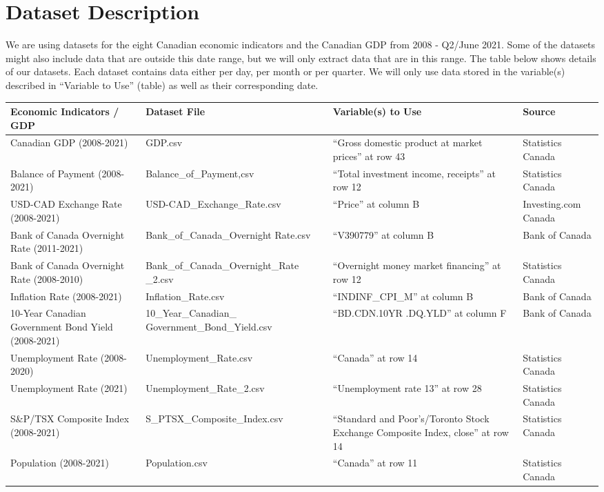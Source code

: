 \documentclass{article}
\begin{document}
\section{Dataset Description}  
We are using datasets for the eight Canadian economic indicators and the Canadian GDP from 2008 - Q2/June 2021. Some of the datasets might also include data that are outside this date range, but we will only extract data that are in this range. The table below shows details of our datasets. Each dataset contains data either per day, per month or per quarter. We will only use data stored in the variable(s) described in “Variable to Use” (table) as well as their corresponding date.
\begin{center}  
  
\begin{tabular}{ | m{3cm} | m{5cm}| m{3cm} | m{2.5cm} | }   
  \hline  
  \textbf{Economic Indicators / GDP} & \textbf{Dataset File} & \textbf{Variable(s) to Use} & \textbf{Source}\\  
  \hline\hline  
  Canadian GDP (2008-2021) & GDP.csv & “Gross domestic product at market prices” at row 43 & Statistics Canada \\  
  \hline  
  Balance of Payment (2008-2021)& Balance\_of\_Payment,csv & “Total investment income, receipts” at row 12 & Statistics Canada \\  
  \hline  
  USD-CAD Exchange Rate (2008-2021)& USD-CAD\_Exchange\_Rate.csv & “Price” at column B & Investing.com Canada  \\  
  \hline  
  Bank of Canada Overnight Rate (2011-2021)& Bank\_of\_Canada\_Overnight Rate.csv & “V390779” at column B & Bank of Canada\\  
  \hline  
  Bank of Canada Overnight Rate (2008-2010)& Bank\_of\_Canada\_Overnight\_Rate
  \_2.csv & “Overnight money market financing” at row 12 & Statistics Canada\\  
  \hline  
  Inflation Rate (2008-2021)& Inflation\_Rate.csv & “INDINF\_CPI\_M” at column B & Bank of Canada\\  
  \hline  
  10-Year Canadian Government Bond Yield (2008-2021)& 10\_Year\_Canadian\_ Government\_Bond\_Yield.csv & “BD.CDN.10YR .DQ.YLD” at column F & Bank of Canada\\  
  \hline  
  Unemployment Rate (2008-2020)& Unemployment\_Rate.csv & “Canada” at row 14 & Statistics Canada \\ 
  \hline  
  Unemployment Rate (2021)& Unemployment\_Rate\_2.csv & “Unemployment rate 13” at row 28 & Statistics Canada \\  
  \hline  
  S\&P/TSX Composite Index (2008-2021)& S\_PTSX\_Composite\_Index.csv & “Standard and Poor's/Toronto Stock Exchange Composite Index, close” at row 14 & Statistics Canada \\  
  \hline  
  Population (2008-2021)& Population.csv & “Canada” at row 11 & Statistics Canada \\  
  \hline  
    
\end{tabular}  
\end{center}  
  
\end{document}
